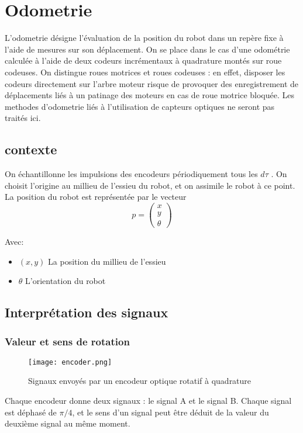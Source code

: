 \chapter{Odometrie}
    L’odometrie désigne l’évaluation de la position du robot dans un repère fixe à l’aide de
    mesures sur son déplacement. On se place dans le cas d’une odométrie calculée à l’aide de deux codeurs incrémentaux à quadrature montés sur roue codeuses. On distingue roues motrices et roues codeuses : en effet, disposer les codeurs directement sur l’arbre moteur risque de provoquer des enregistrement de déplacements liés à un patinage des moteurs en cas de roue motrice bloquée. Les methodes d’odometrie liés à l’utilisation de capteurs optiques ne seront pas traités ici.

    \section{contexte}
        On échantillonne les impulsions des encodeurs périodiquement tous les $d\tau$ . On choisit l’origine au millieu de l’essieu du robot, et on assimile le robot à ce point. La position du robot est représentée par le vecteur
        \begin{equation}
            p = \begin{pmatrix}
                x\\
                y\\
                \theta
            \end{pmatrix}
        \end{equation}

        Avec:
        \begin{itemize}
            \item $(x, y)$ La position du millieu de l’essieu
            \item $\theta$ L'orientation du robot
        \end{itemize}

    \newpage
    \section{Interprétation des signaux}
        \subsection{Valeur et sens de rotation}
        \begin{figure}[h]
            \begin{center}
                \texttt{[image: encoder.png]}
            \end{center}

            \caption{Signaux envoyés par un encodeur optique rotatif à quadrature}
        \end{figure}
        Chaque encodeur donne deux signaux : le signal A et le signal B. Chaque signal est déphasé de $\pi/4$, et le sens d’un signal peut être déduit de la valeur du deuxième signal au même moment.

